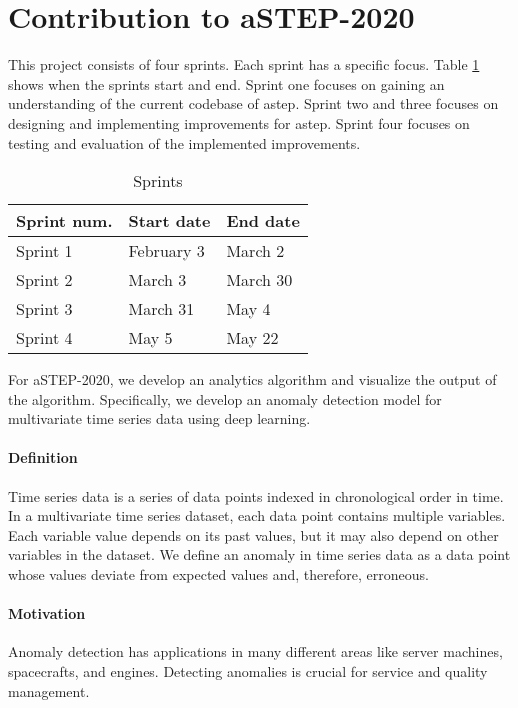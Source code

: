 \section{Contribution to aSTEP-2020}
This project consists of four sprints. Each sprint has a specific focus.
Table \ref{tab:sprints} shows when the sprints start and end. Sprint one focuses on gaining an understanding of the current codebase of \gls{astep}. Sprint two and three focuses on designing and implementing improvements for \gls{astep}. Sprint four focuses on testing and evaluation of the implemented improvements.

\bgroup
\def\arraystretch{1.8}
\begin{table}[htbp]
    \centering
    \begin{tabular}{|l|l|l|}
        \hline
        Sprint num. & Start date & End date \\ \hline
        Sprint 1    & February 3 & March 2  \\ \hline
        Sprint 2    & March 3    & March 30 \\ \hline
        Sprint 3    & March 31   & May 4    \\ \hline
        Sprint 4    & May 5      & May 22   \\ \hline
    \end{tabular}
    \caption{Sprints}
    \label{tab:sprints}
\end{table}
\egroup

\noindent
For aSTEP-2020, we develop an analytics algorithm and visualize the output of the algorithm. Specifically, we develop an anomaly detection model for multivariate time series data using deep learning. 

\paragraph{Definition}
Time series data is a series of data points indexed in chronological order in time. In a multivariate time series dataset, each data point contains multiple variables. Each variable value depends on its past values, but it may also depend on other variables in the dataset. We define an anomaly in time series data as a data point whose values deviate from expected values and, therefore, erroneous\cite{kdd}.

\paragraph{Motivation}
Anomaly detection has applications in many different areas like server machines, spacecrafts, and engines. Detecting anomalies is crucial for service and quality management.\cite{kdd}



